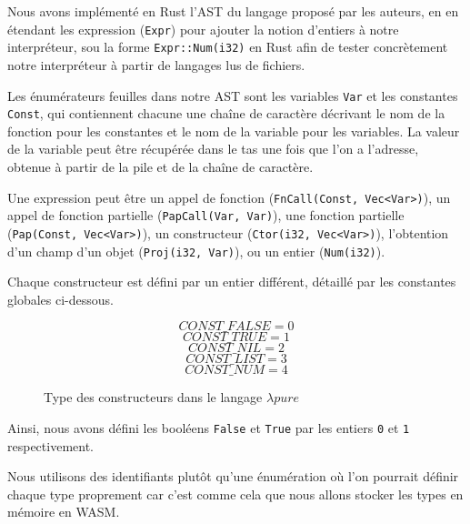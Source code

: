 \documentclass{rapportECL}
\begin{document}
Nous avons implémenté en Rust l'AST du langage proposé par les auteurs, en en étendant les 
expression (\verb|Expr|) pour ajouter la notion d'entiers à notre interpréteur,
sou la forme \verb|Expr::Num(i32)| en Rust afin de tester concrètement notre interpréteur à partir de
langages lus de fichiers.

\bigskip

Les énumérateurs feuilles dans notre AST sont les variables \verb|Var| et les constantes \verb|Const|,
qui contiennent chacune une chaîne de caractère décrivant le nom de la fonction pour les constantes et 
le nom de la variable pour les variables. La valeur de la variable peut être récupérée dans le tas
une fois que l'on a l'adresse, obtenue à partir de la pile et de la chaîne de caractère.

\medskip

Une expression peut être un appel de fonction (\verb|FnCall(Const, Vec<Var>)|), un appel de fonction partielle (\verb|PapCall(Var, Var)|),
une fonction partielle (\verb|Pap(Const, Vec<Var>)|), un constructeur (\verb|Ctor(i32, Vec<Var>)|), 
l'obtention d'un champ d'un objet (\verb|Proj(i32, Var)|), ou un entier (\verb|Num(i32)|).

\medskip

Chaque constructeur est défini par un entier différent, détaillé par les constantes globales ci-dessous.

\begin{figure}[H]
\begin{equation*}
CONST\_FALSE = 0
\end{equation*}
\begin{equation*}
CONST\_TRUE = 1
\end{equation*}
\begin{equation*}
CONST\_NIL = 2
\end{equation*}
\begin{equation*}
CONST\_LIST = 3
\end{equation*}
\begin{equation*}
CONST\_NUM = 4
\end{equation*}
\caption{Type des constructeurs dans le langage $\lambda{pure}$}
\label{listing:types_ctor}
\end{figure}
\FloatBarrier 
Ainsi, nous avons défini les booléens \verb|False| et \verb|True| par les entiers \verb|0| et \verb|1| respectivement.

Nous utilisons des identifiants plutôt qu'une énumération où l'on pourrait définir chaque type proprement car 
c'est comme cela que nous allons stocker les types en mémoire en WASM.
\end{document}
